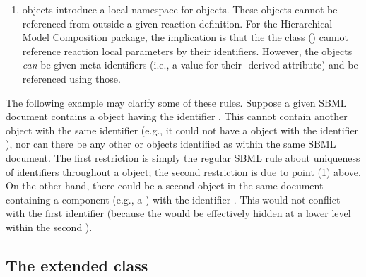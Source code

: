 \begin{enumerate}
\item \Reaction objects introduce a local namespace for \LocalParameter
  objects.  These objects cannot be referenced from outside a given
  reaction definition.  For the Hierarchical Model Composition package,
  the implication is that the the \SBaseRef class ()
  cannot reference reaction local parameters by their identifiers.
  However, the \LocalParameter objects \emph{can} be given meta
  identifiers (i.e., a value for their \SBase-derived 
  attribute) and be referenced using those.

% 


\end{enumerate}

The following example may clarify some of these rules.  Suppose a given
SBML document contains a \Model object having the identifier .
This \Model cannot contain another object with the same identifier
(e.g., it could not have a \Parameter object with the identifier
), nor can there be any other \Model or
\ExternalModelDefinition objects identified as  within the
same SBML document.  The first restriction is simply the regular SBML
rule about uniqueness of identifiers throughout a \Model object; the
second restriction is due to point (1) above.  On the other hand, there
could be a second \Model object in the same document containing a
component (e.g., a \Parameter) with the identifier .  This
would not conflict with the first \Model identifier (because the
\Parameter would be effectively hidden at a lower level within the
second \Model).


\subsection{The extended  class}
\label{sbml-class}
\label{listofmodeldefinitions-class}
\label{listofexternalmodeldefinitions-class}

